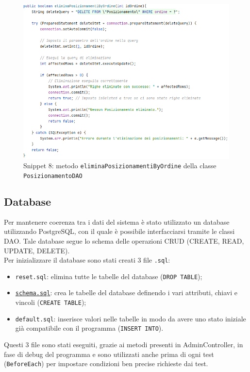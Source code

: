 \documentclass{article}
\newcommand{\code}[1]{\texttt{#1}}
\begin{document}
\begin{figure}[H]
    \centering
    \includegraphics[scale=0.5]{resources/images/Snippets/snippet_eliminaposizionamentibyordine.png}
    \captionsetup{labelformat=empty,labelsep=none}
    \caption{Snippet 8: metodo \code{eliminaPosizionamentiByOrdine} della classe \code{PosizionamentoDAO}}
    \label{fig:snippet_eliminaposizionamentibyordine}
\end{figure}


\subsection{Database}
Per mantenere coerenza tra i dati del sistema è stato utilizzato un database utilizzando PostgreSQL, con il quale è possibile interfacciarsi tramite le classi DAO. Tale database segue lo schema delle operazioni CRUD (CREATE, READ, UPDATE, DELETE). \\
Per inizializzare il database sono stati creati 3 file \code{.sql}:
\begin{itemize}
    \item \code{reset.sql}: elimina tutte le tabelle del database (\code{DROP TABLE});
    \item \hyperref[fig:snippet_createtable]{\code{schema.sql}}: crea le tabelle del database definendo i vari attributi, chiavi e vincoli (\code{CREATE TABLE});
    \item \code{default.sql}: inserisce valori nelle tabelle in modo da avere uno stato iniziale già compatibile con il programma (\code{INSERT INTO}).
\end{itemize}
Questi 3 file sono stati eseguiti, grazie ai metodi presenti in AdminController, in fase di debug del programma e sono utilizzati anche prima di ogni test (\code{BeforeEach}) per impostare condizioni ben precise richieste dai test.
\end{document}
